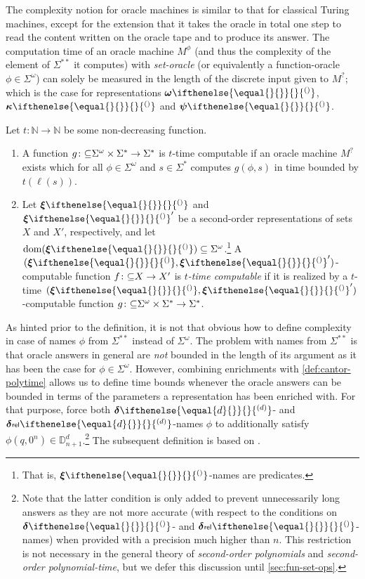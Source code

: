 \documentclass{CSML}
\newcommand{\representation}[2]{ #1\ifnotempty{#2}{^{(#2)}} }
\newcommand{\len}[1]{\ell(#1)}
\newcommand{\ID}{\mathbb{D}}
\newcommand{\IN}{\mathbb{N}}
\newcommand{\parcol}{\colon\mathnormal\subseteq}
\newcommand{\dom}{\mathrm{dom}} %
\newcommand{\Sast}{\Sigma^\ast}
\newcommand{\Cantor}{\Sigma^\omega}
\newcommand{\Baire}{\Sigma^{\ast\ast}}
\newcommand{\distrep}[1][\empty]{ \representation{\bm{\delta}}{#1} }
\newcommand{\reldistrep}[1][\empty]{ \representation{%
	\bm{\delta}\kern.05ex{\scriptstyle\mathsf{rel}}\kern.1ex%
	}{#1} }
\newcommand{\setrep}[1][\empty]{ \representation{\bm{\psi}}{#1} }
\newcommand{\gridrep}[1][\empty]{ \representation{\bm{\kappa}}{#1} }
\newcommand{\wmemrep}[1][\empty]{ \representation{\bm{\omega}}{#1} }
\newcommand{\reptpl}[1][\empty]{ \representation{\bm{\xi}}{#1} }
\newcommand{\ifnotempty}[2]{ \ifthenelse{ \equal{#1}{\empty} }{}{#2} }
\begin{document}
The complexity notion for oracle machines is similar to that for classical
Turing machines, except for the extension that it takes the oracle in total
one step to read the content written on the oracle tape and to produce its
answer. The computation time of an oracle machine $M^\phi$ (and thus the
complexity of the element of $\Baire$ it computes) with \emph{set-oracle} (or
equivalently a function-oracle $\phi \in \Cantor$) can solely be measured in
the length of the discrete input given to $M^?$; which is the case for
representations $\wmemrep$, $\gridrep$ and $\setrep$.

\begin{defi}   \label{def:cantor-polytime}
Let $t \colon \IN \to \IN$ be some non-decreasing function.
\begin{enumerate}
\item A function $g \parcol \Cantor \times \Sast \to \Sast$ is $t$-time
	computable if an oracle machine $M^?$ exists which for all
	$\phi \in \Cantor$ and $s \in \Sast$ computes $g(\phi,s)$ in time
	bounded by $t(\len{s})$.
\item Let $\reptpl$ and $\reptpl'$ be a second-order representations of
	sets $X$ and $X'$, respectively, and let
	$\dom(\reptpl) \subseteq \Cantor$.\footnote{%
		That is, $\reptpl$-names are predicates.}
	A $(\reptpl,\reptpl')$-computable function $f \parcol X \to X'$ is
	\emph{$t$-time computable} if it is realized by a $t$-time
	$(\reptpl,\reptpl')$-computable function
	$g \parcol \Cantor \times \Sast \to \Sast$.
\end{enumerate}
\end{defi}

As hinted prior to the definition, it is not that obvious how to define
complexity in case of names $\phi$ from $\Baire$ instead of $\Cantor$.
The problem with names from $\Baire$ is that oracle answers in general are
\emph{not} bounded in the length of its argument as it has been the case for
$\phi \in \Cantor$.
However, combining enrichments with \cref{def:cantor-polytime} allows us to
define time bounds whenever the oracle answers can be bounded in terms of the
parameters a representation has been enriched with.
For that purpose, force both $\distrep[d]$- and $\reldistrep[d]$-names $\phi$
to additionally satisfy $\phi(q,0^n) \in \ID^d_{n+1}$.\footnote{%
	Note that the latter condition is only added to prevent unnecessarily
	long answers as they are not more accurate (with respect to the conditions
	on $\distrep$- and $\reldistrep$-names) when provided with a precision
	much higher than $n$.
	This restriction is not necessary in the general theory of
	\emph{second-order polynomials} and \emph{second-order polynomial-time},
	but we defer this discussion until \cref{sec:fun-set-ops}.}
The subsequent definition is based on \cite[Def.~2.1+2.2]{KMRZarXiv}.
\end{document}
